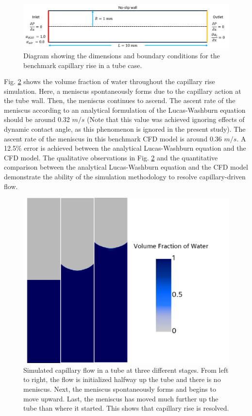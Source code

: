 \documentclass[%
 aip,
 amsmath,amssymb,
 reprint,%
floatfix]{revtex4-1}
\begin{document}
\begin{figure}
    \centering
    \includegraphics[width=\linewidth]{Figures/capillaryRiseDiagram.png}
    \caption{Diagram showing the dimensions and boundary conditions for the benchmark capillary rise in a tube case.}
    \label{fig:benchmark_diagram}
\end{figure}

Fig. \ref{fig:capillaryRise} shows the volume fraction of water throughout the capillary rise simulation. Here, a meniscus spontaneously forms due to the capillary action at the tube wall. Then, the meniscus continues to ascend. The ascent rate of the meniscus according to an analytical formulation of the Lucas-Washburn equation \cite{HAMRAOUI2002415} should be around 0.32 $m/s$  (Note that this value was achieved ignoring effects of dynamic contact angle, as this phenomenon is ignored in the present study). The ascent rate of the meniscus in this benchmark CFD model is around 0.36 $m/s$. A 12.5\% error is achieved between the analytical Lucas-Washburn equation and the CFD model. The qualitative observations in Fig. \ref{fig:capillaryRise} and the quantitative comparison between the analytical Lucas-Washburn equation and the CFD model demonstrate the ability of the simulation methodology to resolve capillary-driven flow. 

\begin{figure}
    \centering
    \includegraphics[width=\linewidth]{Figures/validation_capillaryRise.png}
    \caption{Simulated capillary flow in a tube at three different stages. From left to right, the flow is initialized halfway up the tube and there is no meniscus. Next, the meniscus spontaneously forms and begins to move upward. Last, the meniscus has moved much further up the tube than where it started. This shows that capillary rise is resolved.}
    \label{fig:capillaryRise}
\end{figure}
\end{document}

